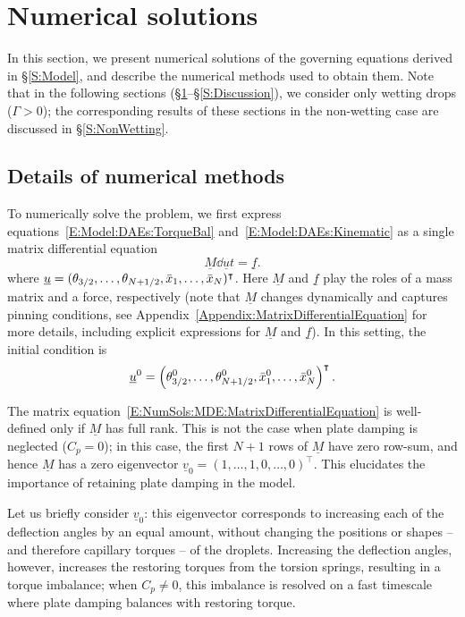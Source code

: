 \section{Numerical solutions}\label{S:Numerics}
In this section, we present numerical solutions of the governing equations derived in \S\ref{S:Model}, and describe the numerical methods used to obtain them. Note that in the following sections (\S\ref{S:Numerics}--\S\ref{S:Discussion}), we consider only wetting drops ($\Gamma >0$); the corresponding results of these sections in the non-wetting case are discussed in \S\ref{S:NonWetting}.

\subsection{Details of numerical methods}\label{S:Numerics:Details}
To numerically solve the problem, we first express equations~\eqref{E:Model:DAEs:TorqueBal} and~\eqref{E:Model:DAEs:Kinematic} as a single matrix differential equation
\begin{equation}\label{E:NumSols:MDE:MatrixDifferentialEquation}
\underline{M}\dd{\underline{u}}{t} =\underline{f}.
\end{equation}
where $\underline{u} = (\theta_{3/2},\dots, \theta_{N+1/2},\bar{x}_1,\dots,\bar{x}_N)^\intercal$. Here $\underline{M}$ and $\underline{f}$ play the roles of a mass matrix and a force, respectively (note that $\underline{M}$ changes dynamically and captures pinning conditions, see Appendix~\ref{Appendix:MatrixDifferentialEquation} for more details, including explicit expressions for  $\underline{M}$ and $\underline{f}$). In this setting, the initial condition is
\begin{equation}\label{E:NumSols:MDE:IC}
\underline{u}^0 =\left(\theta_{3/2}^0, \dots, \theta_{N+1/2}^0,\bar{x}_1^0, \dots,\bar{x}_N^0\right)^\intercal.
\end{equation}

The matrix equation~\eqref{E:NumSols:MDE:MatrixDifferentialEquation} is  well-defined only if $\underline{M}$ has full rank. This is not the case when plate damping is neglected ($C_p = 0$); in this case, the first $N+1$ rows of $\underline{M}$ have zero row-sum, and hence $\underline{M}$ has a zero eigenvector $\underline{v}_0 =(1,\dots,1,0,\dots,0)^\intercal$. This elucidates the importance of retaining plate damping in the model.

Let us briefly consider $\underline{v}_0$: this eigenvector corresponds to increasing each of the deflection angles by an equal amount, without changing the positions or shapes -- and therefore capillary torques -- of the droplets. Increasing the deflection angles, however, increases the restoring torques from the torsion springs, resulting in a torque imbalance; when $C_p \neq 0$, this imbalance is resolved on a fast timescale where plate damping balances with restoring torque.

